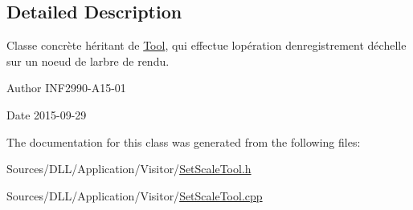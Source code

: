 \subsection{Detailed Description}
Classe concrète héritant de \hyperlink{class_tool}{Tool}, qui effectue l\textquotesingle{}opération d\textquotesingle{}enregistrement d\textquotesingle{}échelle sur un noeud de l\textquotesingle{}arbre de rendu. 

\begin{DoxyAuthor}{Author}
I\+N\+F2990-\/\+A15-\/01 
\end{DoxyAuthor}
\begin{DoxyDate}{Date}
2015-\/09-\/29 
\end{DoxyDate}


The documentation for this class was generated from the following files\+:\begin{DoxyCompactItemize}
\item 
Sources/\+D\+L\+L/\+Application/\+Visitor/\hyperlink{_set_scale_tool_8h}{Set\+Scale\+Tool.\+h}\item 
Sources/\+D\+L\+L/\+Application/\+Visitor/\hyperlink{_set_scale_tool_8cpp}{Set\+Scale\+Tool.\+cpp}\end{DoxyCompactItemize}
